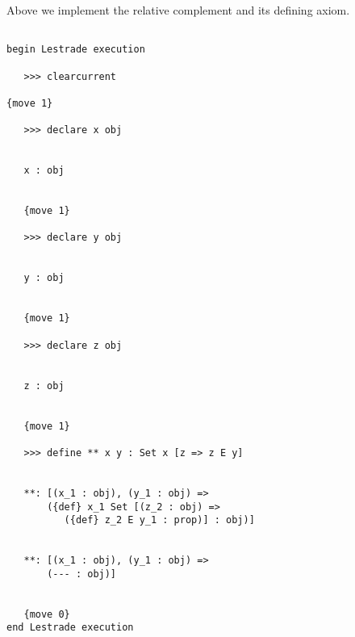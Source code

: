 \documentclass[12pt]{article}
\begin{document}
Above we implement the relative complement and its defining axiom.

\begin{verbatim}

begin Lestrade execution

   >>> clearcurrent

{move 1}

   >>> declare x obj


   x : obj


   {move 1}

   >>> declare y obj


   y : obj


   {move 1}

   >>> declare z obj


   z : obj


   {move 1}

   >>> define ** x y : Set x [z => z E y]


   **: [(x_1 : obj), (y_1 : obj) => 
       ({def} x_1 Set [(z_2 : obj) => 
          ({def} z_2 E y_1 : prop)] : obj)]


   **: [(x_1 : obj), (y_1 : obj) => 
       (--- : obj)]


   {move 0}
end Lestrade execution
\end{verbatim}
\end{document}
